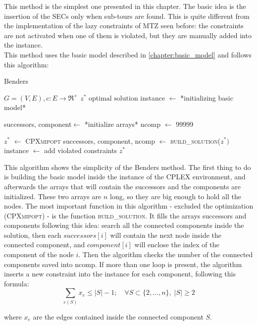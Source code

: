 This method is the simplest one presented in this chapter. The basic idea is the insertion of the SECs only when sub-tours are found. This is quite different from the implementation of the lazy constraints of MTZ seen before: the constraints are not activated when one of them is violated, but they are manually added into the instance.\\
This method uses the basic model described in \ref{chapter:basic_model} and follows this algorithm:

\begin{algorithm}
	\caption{Benders}\label{algo:benders}
	\begin{algorithmic}[1]
		\Require $G=(V,E), c:E\rightarrow \Re^+$
		\Ensure $z^*\text{ optimal solution}$
		\State instance $\gets$ *initializing basic model*
		
		\State successors, component$\gets$ *initialize arrays*
		\State ncomp $\gets$ 99999
		
			\State $z^*$ $\gets$ \textsc{CPXmipopt}
			\State successors, component, ncomp $\gets$ \textsc{build\_solution}($z^*)$
				\State instance $\gets$ add violated constraints
			\EndIf	
		\EndWhile
		\State \Return $z^*$
	\end{algorithmic}
\end{algorithm}

This algorithm shows the simplicity of the Benders method. The first thing to do is building the basic model inside the instance of the CPLEX environment, and afterwards the arrays that will contain the successors and the components are initialized. These two arrays are $n$ long, so they are big enough to hold all the nodes. The most important function in this algorithm - excluded the optimization (\textsc{CPXmipopt}) - is the function \textsc{build\_solution}. It fills the arrays successors and components following this idea: search all the connected components inside the solution, then each $successors[i]$ will contain the next node inside the connected component, and $component[i]$ will enclose the index of the component of the node $i$. Then the algorithm checks the number of the connected components saved into ncomp. If more than one loop is present, the algorithm inserts a new constraint into the instance for each component, following this formula:
\begin{equation}
\sum_{e(S)}x_{e}\le |S|-1; \quad \forall S \subset\{2, \dots, n\}, \; |S|\ge 2
\end{equation}


where $x_e$ are the edges contained inside the connected component $S$.